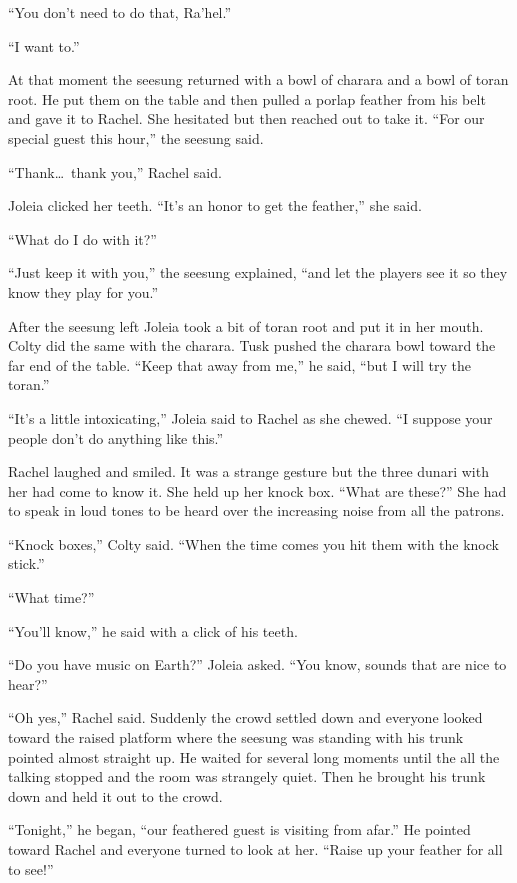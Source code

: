 ``You don't need to do that, Ra'hel.''

``I want to.''

At that moment the seesung returned with a bowl of charara and a bowl of toran root. He put them
on the table and then pulled a porlap feather from his belt and gave it to Rachel. She hesitated
but then reached out to take it. ``For our special guest this hour,'' the seesung said.

``Thank\ldots\ thank you,'' Rachel said.

Joleia clicked her teeth. ``It's an honor to get the feather,'' she said.

``What do I do with it?''

``Just keep it with you,'' the seesung explained, ``and let the players see it so they know they
play for you.''

After the seesung left Joleia took a bit of toran root and put it in her mouth. Colty did the
same with the charara. Tusk pushed the charara bowl toward the far end of the table. ``Keep that
away from me,'' he said, ``but I will try the toran.''

``It's a little intoxicating,'' Joleia said to Rachel as she chewed. ``I suppose your people
don't do anything like this.''

Rachel laughed and smiled. It was a strange gesture but the three dunari with her had come to
know it. She held up her knock box. ``What are these?'' She had to speak in loud tones to be
heard over the increasing noise from all the patrons.

``Knock boxes,'' Colty said. ``When the time comes you hit them with the knock stick.''

``What time?''

``You'll know,'' he said with a click of his teeth.

``Do you have music on Earth?'' Joleia asked. ``You know, sounds that are nice to hear?''

``Oh yes,'' Rachel said. Suddenly the crowd settled down and everyone looked toward the raised
platform where the seesung was standing with his trunk pointed almost straight up. He waited for
several long moments until the all the talking stopped and the room was strangely quiet. Then he
brought his trunk down and held it out to the crowd.

``Tonight,'' he began, ``our feathered guest is visiting from afar.'' He pointed toward Rachel
and everyone turned to look at her. ``Raise up your feather for all to see!''

